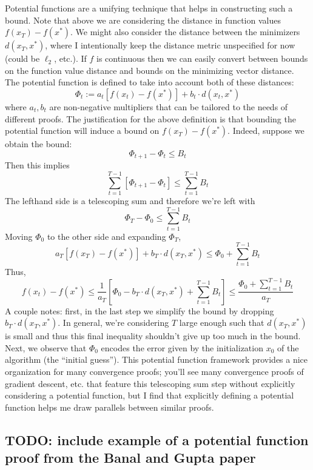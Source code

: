 \documentclass[12pt]{article}
\begin{document}
Potential functions are a unifying technique that helps in constructing such a bound. Note that above we are considering the distance in function values $f(x_T) - f(x^*)$. We might also consider the distance 
between the minimizers $d(x_T, x^*)$, where I intentionally keep the distance metric unspecified for now (could be $\ell_2$, etc.). If $f$ is continuous then we can easily convert between bounds on the function
value distance and bounds on the minimizing vector distance. The potential function is defined to take into account both of these distances: 
\[\Phi_t := a_t [f(x_t) - f(x^*)] + b_t \cdot d(x_t, x^*)\]
where $a_t, b_t$ are non-negative multipliers that can be tailored to the needs of different proofs. The justification for the above definition is that bounding the potential function will induce a bound on 
$f(x_T) - f(x^*)$. Indeed, suppose we obtain the bound: 
\[\Phi_{t + 1} - \Phi_t \leq B_t\]
Then this implies
\[\sum_{t = 1}^{T - 1} [\Phi_{t + 1} - \Phi_t] \leq  \sum_{t = 1}^{T - 1} B_t\]
The lefthand side is a telescoping sum and therefore we're left with 
\[\Phi_{T} - \Phi_0 \leq  \sum_{t = 1}^{T - 1} B_t\]
Moving $\Phi_0$ to the other side and expanding $\Phi_{T}$, 
\[ a_T [f(x_T) - f(x^*)] + b_T \cdot d(x_T, x^*) \leq \Phi_0 + \sum_{t = 1}^{T - 1} B_t\]
Thus, 
\[ f(x_t) - f(x^*) \leq \frac{1}{a_T}\left[\Phi_0 - b_T \cdot d(x_T, x^*) + \sum_{t = 1}^{T - 1} B_t\right] \leq \frac{\Phi_0 + \sum_{t = 1}^{T - 1} B_t}{a_T}\]
A couple notes: first, in the last step we simplify the bound by dropping $b_T \cdot d(x_T, x^*)$. In general, we're considering $T$ large enough such that $d(x_T, x^*)$ is small and thus
this final inequality shouldn't give up too much in the bound. Next, we observe that $\Phi_0$ encodes the error given by the initialization $x_0$ of the algorithm (the ``initial guess''). This potential
function framework provides a nice organization for many convergence proofs; you'll see many convergence proofs of gradient descent, etc. that feature this telescoping sum step without explicitly 
considering a potential function, but I find that explicitly defining a potential function helps me draw parallels between similar proofs. 

\subsection{TODO: include example of a potential function proof from the Banal and Gupta paper}
\end{document}
